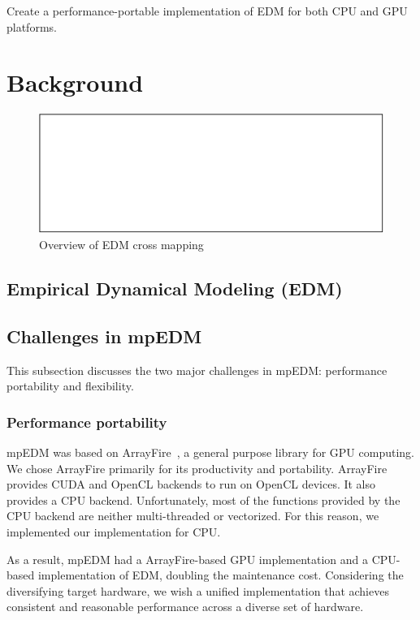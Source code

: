 \documentclass[conference]{IEEEtran}
\begin{document}
Create a performance-portable implementation of EDM for both CPU and GPU
platforms.

\clearpage

\section{Background}

\begin{figure}
    \centering
    \includegraphics{figs/xmap_overview}
    \caption{Overview of EDM cross mapping}%
    \label{fig:edm}
\end{figure}

\subsection{Empirical Dynamical Modeling (EDM)}

\subsection{Challenges in mpEDM}\label{sec:challenges}

This subsection discusses the two major challenges in mpEDM: performance
portability and flexibility.

\subsubsection{Performance portability}

mpEDM was based on ArrayFire~\cite{Malcolm2012}, a general purpose library for
GPU computing. We chose ArrayFire primarily for its productivity and
portability. ArrayFire provides CUDA and OpenCL backends to run on OpenCL
devices. It also provides a CPU backend. Unfortunately, most of the functions
provided by the CPU backend are neither multi-threaded or vectorized. For this
reason, we implemented our implementation for CPU\@.

As a result, mpEDM had a ArrayFire-based GPU implementation and a CPU-based
implementation of EDM, doubling the maintenance cost. Considering the
diversifying target hardware, we wish a unified implementation that achieves
consistent and reasonable performance across a diverse set of hardware.
\end{document}
